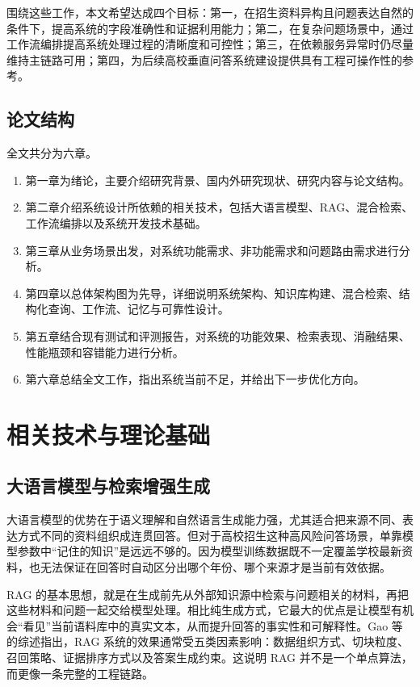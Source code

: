 \documentclass[UTF8,zihao=-4,oneside]{ctexbook}
\numberwithin{equation}{chapter}
\begin{document}
围绕这些工作，本文希望达成四个目标：第一，在招生资料异构且问题表达自然的条件下，提高系统的字段准确性和证据利用能力；第二，在复杂问题场景中，通过工作流编排提高系统处理过程的清晰度和可控性；第三，在依赖服务异常时仍尽量维持主链路可用；第四，为后续高校垂直问答系统建设提供具有工程可操作性的参考。

\section{论文结构}
全文共分为六章。
\begin{enumerate}
  \item 第一章为绪论，主要介绍研究背景、国内外研究现状、研究内容与论文结构。
  \item 第二章介绍系统设计所依赖的相关技术，包括大语言模型、RAG、混合检索、工作流编排以及系统开发技术基础。
  \item 第三章从业务场景出发，对系统功能需求、非功能需求和问题路由需求进行分析。
  \item 第四章以总体架构图为先导，详细说明系统架构、知识库构建、混合检索、结构化查询、工作流、记忆与可靠性设计。
  \item 第五章结合现有测试和评测报告，对系统的功能效果、检索表现、消融结果、性能瓶颈和容错能力进行分析。
  \item 第六章总结全文工作，指出系统当前不足，并给出下一步优化方向。
\end{enumerate}

\chapter{相关技术与理论基础}

\section{大语言模型与检索增强生成}
大语言模型的优势在于语义理解和自然语言生成能力强，尤其适合把来源不同、表达方式不同的资料组织成连贯回答。但对于高校招生这种高风险问答场景，单靠模型参数中“记住的知识”是远远不够的。因为模型训练数据既不一定覆盖学校最新资料，也无法保证在回答时自动区分出哪个年份、哪个来源才是当前有效依据。

RAG 的基本思想，就是在生成前先从外部知识源中检索与问题相关的材料，再把这些材料和问题一起交给模型处理\cite{lewis2020rag}。相比纯生成方式，它最大的优点是让模型有机会“看见”当前语料库中的真实文本，从而提升回答的事实性和可解释性。Gao 等的综述指出，RAG 系统的效果通常受五类因素影响：数据组织方式、切块粒度、召回策略、证据排序方式以及答案生成约束\cite{gao2023survey}。这说明 RAG 并不是一个单点算法，而更像一条完整的工程链路。
\end{document}
